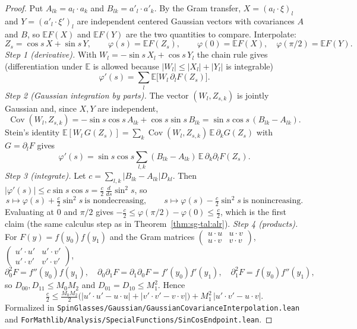 \begin{proof}
\leanok
Put $A_{lk}=a_l\cdot a_k$ and $B_{lk}=a'_l\cdot a'_k$. By the Gram transfer, $X=(a_l\cdot\xi)_l$ and $Y=(a'_l\cdot\xi')_l$ are independent centered Gaussian vectors with covariances $A$ and $B$, so $\mathbb{E}F(X)$ and $\mathbb{E}F(Y)$ are the two quantities to compare. Interpolate:
\[
Z_s=\cos s\,X+\sin s\,Y,\qquad \varphi(s)=\mathbb{E}F(Z_s),\qquad \varphi(0)=\mathbb{E}F(X),\quad\varphi(\pi/2)=\mathbb{E}F(Y).
\]
\emph{Step 1 (derivative).} With $W_l=-\sin s\,X_l+\cos s\,Y_l$ the chain rule gives (differentiation under $\mathbb{E}$ is allowed because $|W_l|\le|X_l|+|Y_l|$ is integrable)
\[
\varphi'(s)=\sum_l\mathbb{E}\big[W_l\,\partial_lF(Z_s)\big].
\]
\emph{Step 2 (Gaussian integration by parts).} The vector $(W_l,Z_{s,k})$ is jointly Gaussian and, since $X,Y$ are independent,
\[
\operatorname{Cov}(W_l,Z_{s,k})=-\sin s\cos s\,A_{lk}+\cos s\sin s\,B_{lk}=\sin s\cos s\,(B_{lk}-A_{lk}).
\]
Stein's identity $\mathbb{E}[W_l\,G(Z_s)]=\sum_k\operatorname{Cov}(W_l,Z_{s,k})\,\mathbb{E}\,\partial_kG(Z_s)$ with $G=\partial_lF$ gives
\[
\varphi'(s)=\sin s\cos s\sum_{l,k}(B_{lk}-A_{lk})\,\mathbb{E}\,\partial_k\partial_lF(Z_s).
\]
\emph{Step 3 (integrate).} Let $c=\sum_{l,k}|B_{lk}-A_{lk}|D_{kl}$. Then $|\varphi'(s)|\le c\sin s\cos s=\frac c2\,\frac d{ds}\sin^2s$, so
\[
s\mapsto\varphi(s)+\tfrac c2\sin^2s\ \text{is nondecreasing},\qquad s\mapsto\varphi(s)-\tfrac c2\sin^2s\ \text{is nonincreasing}.
\]
Evaluating at $0$ and $\pi/2$ gives $-\frac c2\le\varphi(\pi/2)-\varphi(0)\le\frac c2$, which is the first claim (the same calculus step as in Theorem~\ref{thm:sg-tal:alr}).
\emph{Step 4 (products).} For $F(y)=f(y_0)f(y_1)$ and the Gram matrices $\left(\begin{smallmatrix}u\cdot u&u\cdot v\\u\cdot v&v\cdot v\end{smallmatrix}\right)$, $\left(\begin{smallmatrix}u'\cdot u'&u'\cdot v'\\u'\cdot v'&v'\cdot v'\end{smallmatrix}\right)$,
\[
\partial_0^2F=f''(y_0)f(y_1),\quad\partial_0\partial_1F=\partial_1\partial_0F=f'(y_0)f'(y_1),\quad\partial_1^2F=f(y_0)f''(y_1),
\]
so $D_{00},D_{11}\le M_0M_2$ and $D_{01}=D_{10}\le M_1^2$. Hence
\[
\tfrac c2\le \tfrac{M_0M_2}2\big(|u'\cdot u'-u\cdot u|+|v'\cdot v'-v\cdot v|\big)+M_1^2\,|u'\cdot v'-u\cdot v|.
\]
Formalized in \texttt{SpinGlasses/Gaussian/GaussianCovarianceInterpolation.lean} and \texttt{ForMathlib/Analysis/SpecialFunctions/SinCosEndpoint.lean}.
\end{proof}

